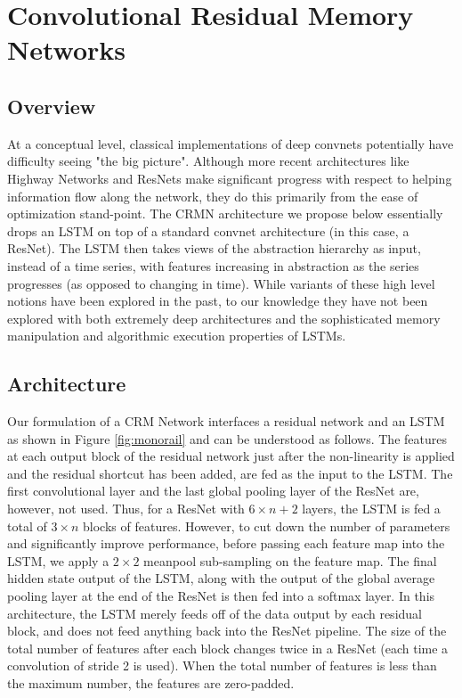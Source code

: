 \documentclass{article}
\begin{document}
\section{Convolutional Residual Memory Networks}
\subsection{Overview}
At a conceptual level, classical implementations of deep convnets potentially have difficulty seeing "the big picture". Although more recent architectures like Highway Networks and ResNets make significant progress with respect to helping information flow along the network, they do this primarily from the ease of optimization stand-point. The CRMN architecture we propose below essentially drops an LSTM on top of a standard convnet architecture (in this case, a ResNet). The LSTM then takes views of the abstraction hierarchy as input, instead of a time series, with features increasing in abstraction as the series progresses (as opposed to changing in time). While variants of these high level notions have been explored in the past, to our knowledge they have not been explored with both extremely deep architectures and the sophisticated memory manipulation and algorithmic execution properties of LSTMs. 

\subsection{Architecture}
\label{sec:arch}
Our formulation of a CRM Network interfaces a residual network and an LSTM as shown in Figure \ref{fig:monorail} and can be understood as follows. The features at each output block of the residual network just after the non-linearity is applied and the residual shortcut has been added, are fed as the input to the LSTM. The first convolutional layer and the last global pooling 
layer of the ResNet are, however, not used. Thus, for a ResNet with \(6\times{n}+2\) layers, the LSTM is fed a total of \(3\times{n}\) blocks of features. %
However, to cut down the number of parameters and significantly improve performance, before passing each feature map into the LSTM, we apply a \(2\times{2}\) meanpool sub-sampling on the feature map. The final hidden state output of the LSTM, along with the output of the global average pooling layer at the end of the ResNet %
is then fed into a softmax layer. In this architecture, the LSTM merely feeds off of the data output by each residual block, and does not feed anything back into the ResNet pipeline. The size of the total number of features after each block changes twice in a ResNet (each time a convolution of stride 2 is used). When the total number of features is less than the maximum number, the features are zero-padded.
\end{document}
